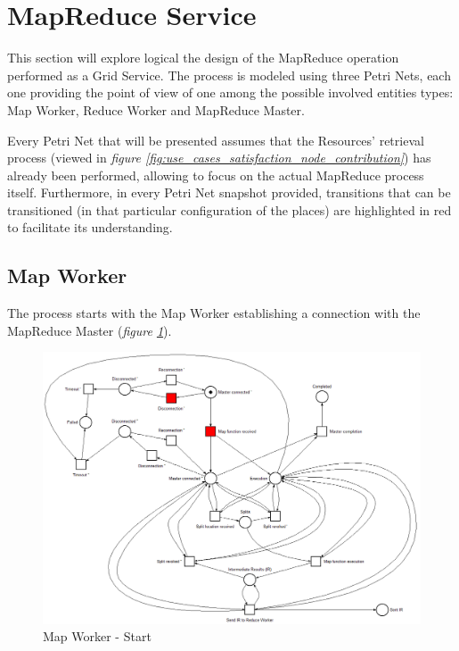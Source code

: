 \section{MapReduce Service}\label{mapreduce_service}
This section will explore logical the design of the MapReduce operation performed as a Grid Service. The process is modeled using three Petri Nets, each one providing the point of view of one among the possible involved entities types: Map Worker, Reduce Worker and MapReduce Master.

Every Petri Net that will be presented assumes that the Resources' retrieval process (viewed in \textit{figure \ref{fig:use_cases_satisfaction_node_contribution}}) has already been performed, allowing to focus on the actual MapReduce process itself.
Furthermore, in every Petri Net snapshot provided, transitions that can be transitioned (in that particular configuration of the places) are highlighted in red to facilitate its understanding.
  
\subsection{Map Worker}
The process starts with the Map Worker establishing a connection with the MapReduce Master (\textit{figure \ref{fig:map_worker_petri_net_1}}).

\begin{figure}[!ht]
    \centering
    \includegraphics[width=\linewidth]{document/chapters/chapter_6/images/map_worker_petri_net_1.png}
    \caption{Map Worker - Start}
    \label{fig:map_worker_petri_net_1}
\end{figure}

